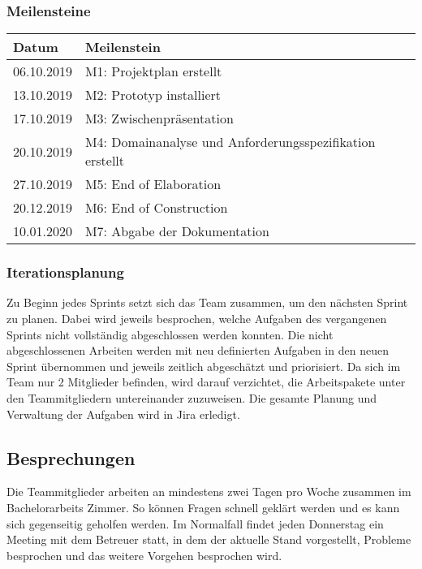 \subsubsection{Meilensteine}
\begin{center}
	\begin{tabular}{| m{3cm} | m{9cm}|}
	\hline
	\textbf{Datum} & \textbf{Meilenstein} \\
	\hline
	06.10.2019 & M1: Projektplan erstellt \\
	\hline
	13.10.2019 & M2: Prototyp installiert \\
	\hline
	17.10.2019 & M3: Zwischenpräsentation \\
	\hline
	20.10.2019 & M4: Domainanalyse und Anforderungsspezifikation erstellt \\
	\hline
	27.10.2019 & M5: End of Elaboration \\
	\hline
	20.12.2019 & M6: End of Construction \\
	\hline
	10.01.2020 & M7: Abgabe der Dokumentation \\
	\hline
	\end{tabular}
\end{center}

\subsubsection{Iterationsplanung}
Zu Beginn jedes Sprints setzt sich das Team zusammen, um den nächsten Sprint zu planen. Dabei wird jeweils besprochen, welche Aufgaben des vergangenen Sprints nicht vollständig abgeschlossen werden konnten. Die nicht abgeschlossenen Arbeiten werden mit neu definierten Aufgaben in den neuen Sprint übernommen und jeweils zeitlich abgeschätzt und priorisiert. Da sich im Team nur 2 Mitglieder befinden, wird darauf verzichtet, die Arbeitspakete unter den Teammitgliedern untereinander zuzuweisen. Die gesamte Planung und Verwaltung der Aufgaben wird in Jira erledigt.

\subsection{Besprechungen}
Die Teammitglieder arbeiten an mindestens zwei Tagen pro Woche zusammen im Bachelorarbeits Zimmer. So können Fragen schnell geklärt werden und es kann sich gegenseitig geholfen werden. Im Normalfall findet jeden Donnerstag ein Meeting mit dem Betreuer statt, in dem der aktuelle Stand vorgestellt, Probleme besprochen und das weitere Vorgehen besprochen wird.

